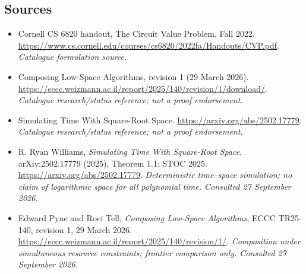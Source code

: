 \documentclass[11pt,a4paper]{article}
\numberwithin{equation}{section}
\begin{document}
\subsection{Sources}
\begin{itemize}\raggedright
\item[\textnormal{[S1]}]\hypertarget{source:60:1}{} Cornell CS 6820 handout, The Circuit Value Problem, Fall 2022.
\url{https://www.cs.cornell.edu/courses/cs6820/2022fa/Handouts/CVP.pdf}.
{\small\textit{Catalogue formulation source.}}
\item[\textnormal{[S2]}]\hypertarget{source:60:2}{} Composing Low-Space Algorithms, revision 1 (29 March 2026).
\url{https://eccc.weizmann.ac.il/report/2025/140/revision/1/download/}.
{\small\textit{Catalogue research/status reference; not a proof endorsement.}}
\item[\textnormal{[S3]}]\hypertarget{source:60:3}{} Simulating Time With Square-Root Space.
\url{https://arxiv.org/abs/2502.17779}.
{\small\textit{Catalogue research/status reference; not a proof endorsement.}}

\item[\textnormal{[E1]}]\hypertarget{extra:60:1}{} R. Ryan Williams, \emph{Simulating Time With Square-Root Space}, arXiv:2502.17779 (2025), Theorem 1.1; STOC 2025.
\url{https://arxiv.org/abs/2502.17779}.
{\small\textit{Deterministic time--space simulation; no claim of logarithmic space for all polynomial time. Consulted 27 September 2026.}}
\item[\textnormal{[E2]}]\hypertarget{extra:60:2}{} Edward Pyne and Roei Tell, \emph{Composing Low-Space Algorithms}, ECCC TR25-140, revision 1, 29 March 2026.
\url{https://eccc.weizmann.ac.il/report/2025/140/revision/1/}.
{\small\textit{Composition under simultaneous resource constraints; frontier comparison only. Consulted 27 September 2026.}}
\end{itemize}
\end{document}
